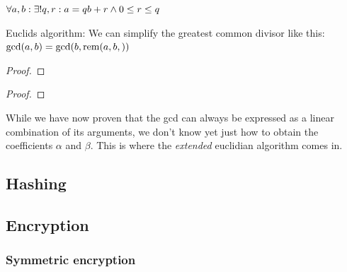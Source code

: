 \begin{theorem}
	$ \forall a,b: \exists ! q, r: a = qb + r \land 0 \leq r \leq q $
\end{theorem}

\begin{theorem}	
    Euclids algorithm: We can simplify the greatest common divisor like this: $  \text{gcd}(a,b)  =  \text{gcd}(b, \text{rem}(a,b,))   $
\end{theorem}

\begin{proof}
\end{proof}


\begin{proof}
\end{proof}

While we have now proven that the gcd can always be expressed as a linear combination of its arguments, we don't know yet just how to obtain the coefficients $\alpha$ and $\beta$. This is where the \emph{extended} euclidian algorithm comes in. 




\subsection{Hashing}

\subsection{Encryption}

\subsubsection{Symmetric encryption}

